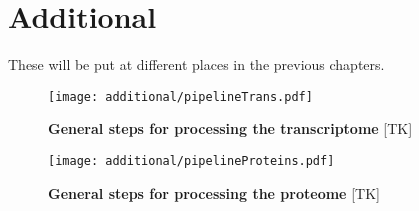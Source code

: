 \chapter*{Additional}


These will be put at different places in the previous chapters.

\begin{figure}
    \texttt{[image: additional/pipelineTrans.pdf]}\centering
    \caption[General steps for processing the transcriptomic
    data]{\label{fig:pipelineTrans}\textbf{General steps for processing the
    transcriptome} [TK]}
\end{figure}

\begin{figure}
    \texttt{[image: additional/pipelineProteins.pdf]}\centering
    \caption[General steps for processing the proteome
    data]{\label{fig:pipelineProt}\textbf{General steps for processing the
    proteome} [TK] }
\end{figure}



